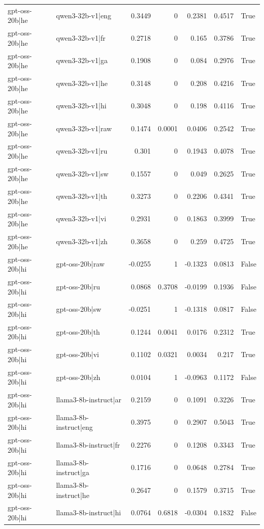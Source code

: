 \begin{table}
\begin{tabular}{l l r r r r l}
gpt-oss-20b|he & qwen3-32b-v1|eng & 0.3449 & 0 & 0.2381 & 0.4517 & True \\
gpt-oss-20b|he & qwen3-32b-v1|fr & 0.2718 & 0 & 0.165 & 0.3786 & True \\
gpt-oss-20b|he & qwen3-32b-v1|ga & 0.1908 & 0 & 0.084 & 0.2976 & True \\
gpt-oss-20b|he & qwen3-32b-v1|he & 0.3148 & 0 & 0.208 & 0.4216 & True \\
gpt-oss-20b|he & qwen3-32b-v1|hi & 0.3048 & 0 & 0.198 & 0.4116 & True \\
gpt-oss-20b|he & qwen3-32b-v1|raw & 0.1474 & 0.0001 & 0.0406 & 0.2542 & True \\
gpt-oss-20b|he & qwen3-32b-v1|ru & 0.301 & 0 & 0.1943 & 0.4078 & True \\
gpt-oss-20b|he & qwen3-32b-v1|sw & 0.1557 & 0 & 0.049 & 0.2625 & True \\
gpt-oss-20b|he & qwen3-32b-v1|th & 0.3273 & 0 & 0.2206 & 0.4341 & True \\
gpt-oss-20b|he & qwen3-32b-v1|vi & 0.2931 & 0 & 0.1863 & 0.3999 & True \\
gpt-oss-20b|he & qwen3-32b-v1|zh & 0.3658 & 0 & 0.259 & 0.4725 & True \\
gpt-oss-20b|hi & gpt-oss-20b|raw & -0.0255 & 1 & -0.1323 & 0.0813 & False \\
gpt-oss-20b|hi & gpt-oss-20b|ru & 0.0868 & 0.3708 & -0.0199 & 0.1936 & False \\
gpt-oss-20b|hi & gpt-oss-20b|sw & -0.0251 & 1 & -0.1318 & 0.0817 & False \\
gpt-oss-20b|hi & gpt-oss-20b|th & 0.1244 & 0.0041 & 0.0176 & 0.2312 & True \\
gpt-oss-20b|hi & gpt-oss-20b|vi & 0.1102 & 0.0321 & 0.0034 & 0.217 & True \\
gpt-oss-20b|hi & gpt-oss-20b|zh & 0.0104 & 1 & -0.0963 & 0.1172 & False \\
gpt-oss-20b|hi & llama3-8b-instruct|ar & 0.2159 & 0 & 0.1091 & 0.3226 & True \\
gpt-oss-20b|hi & llama3-8b-instruct|eng & 0.3975 & 0 & 0.2907 & 0.5043 & True \\
gpt-oss-20b|hi & llama3-8b-instruct|fr & 0.2276 & 0 & 0.1208 & 0.3343 & True \\
gpt-oss-20b|hi & llama3-8b-instruct|ga & 0.1716 & 0 & 0.0648 & 0.2784 & True \\
gpt-oss-20b|hi & llama3-8b-instruct|he & 0.2647 & 0 & 0.1579 & 0.3715 & True \\
gpt-oss-20b|hi & llama3-8b-instruct|hi & 0.0764 & 0.6818 & -0.0304 & 0.1832 & False \\

\end{tabular}
\end{table}
